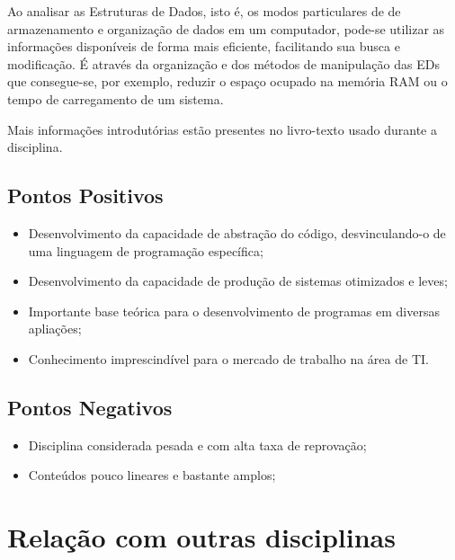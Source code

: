 \documentclass[a4paper]{article}
\begin{document}
Ao analisar as Estruturas de Dados, isto é, os modos particulares de de armazenamento e organização de dados em um computador, pode-se utilizar as informações disponíveis de forma mais eficiente, facilitando sua busca e modificação. É através da organização e dos métodos de manipulação das EDs que consegue-se, por exemplo, reduzir o espaço ocupado na memória RAM ou o tempo de carregamento de um sistema.

Mais informações introdutórias estão presentes no livro-texto \cite{livro} usado durante a disciplina.

\subsection{Pontos Positivos}
\begin{itemize}
	\item Desenvolvimento da capacidade de abstração do código, desvinculando-o de uma linguagem de programação específica;
	\item Desenvolvimento da capacidade de produção de sistemas otimizados e leves;
    \item Importante base teórica para o desenvolvimento de programas em diversas apliações;
    \item Conhecimento imprescindível para o mercado de trabalho na área de TI.
\end{itemize}

\subsection{Pontos Negativos}
\begin{itemize}
	\item Disciplina considerada pesada e com alta taxa de reprovação;
    \item Conteúdos pouco lineares e bastante amplos;
\end{itemize}

\section{Relação com outras disciplinas}
\end{document}
